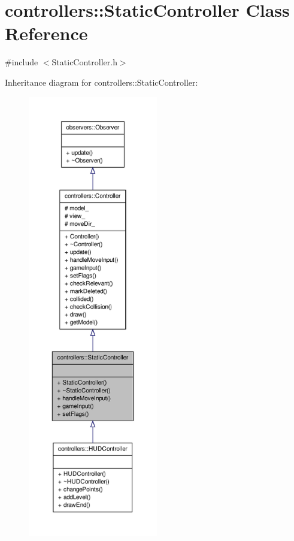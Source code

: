 \hypertarget{classcontrollers_1_1StaticController}{\section{controllers\-:\-:\-Static\-Controller \-Class \-Reference}
\label{d7/dbb/classcontrollers_1_1StaticController}
}


{\ttfamily \#include $<$\-Static\-Controller.\-h$>$}



\-Inheritance diagram for controllers\-:\-:\-Static\-Controller\-:
\nopagebreak
\begin{figure}[H]
\begin{center}
\leavevmode
\includegraphics[height=550pt]{d8/db2/classcontrollers_1_1StaticController__inherit__graph}
\end{center}
\end{figure}



